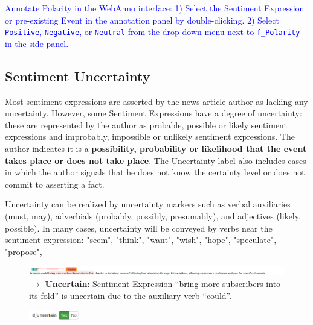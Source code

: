 \noindent
\textcolor{Blue}{Annotate Polarity in the WebAnno interface:
1) Select the Sentiment Expression or pre-existing Event in the annotation panel by double-clicking.
2) Select \texttt{Positive}, \texttt{Negative}, or \texttt{Neutral} from the drop-down menu next to \texttt{f\_Polarity} in the side panel.}

\subsection{Sentiment Uncertainty}
\label{sec:uncertaintydefinition}
Most sentiment expressions are asserted by the news article author as lacking any uncertainty.
However, some Sentiment Expressions have a degree of uncertainty: these are represented by the author as probable, possible or likely sentiment expressions and improbably, impossible or unlikely sentiment expressions.
The author indicates it is a \textbf{possibility, probability or likelihood that the event takes place or does not take place}.
The Uncertainty label also includes cases in which the author signals that he does not know the certainty level or does not commit to asserting a fact.

Uncertainty can be realized by uncertainty markers such as verbal auxiliaries (must, may), adverbials (probably, possibly, presumably), and adjectives (likely, possible).
In many cases, uncertainty will be conveyed by verbs near the sentiment expression: "seem", "think", "want", "wish", "hope", "speculate", "propose", 

\begin{figure}[h]
    \centering
    \includegraphics[width=\textwidth]{img/amzn04s31 uncertain example.png}
    \caption*{$\rightarrow$ \textbf{Uncertain}: Sentiment Expression ``bring more subscribers into its fold'' is uncertain due to the auxiliary verb ``could''.}
    \label{fig:my_label}
\end{figure}

\begin{figure}
    \centering
    \includegraphics[width=0.2\textwidth]{img/uncertainui.png}
    \label{fig:uncertainui}
\end{figure}

